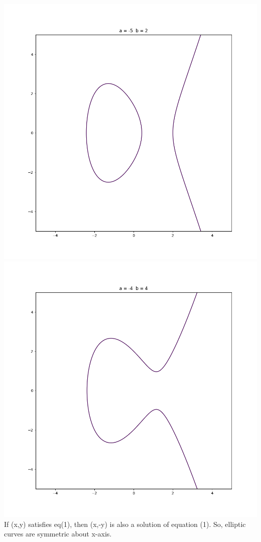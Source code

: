 \documentclass[12pt,a4paper]{report}
\begin{document}
\includegraphics[scale=0.32]{Figure_3}
\includegraphics[scale=0.32]{Figure_4}
If (x,y) satisfies eq(1), then (x,-y) is also a solution of equation (1). So, elliptic curves are symmetric about x-axis. \\
\end{document}

